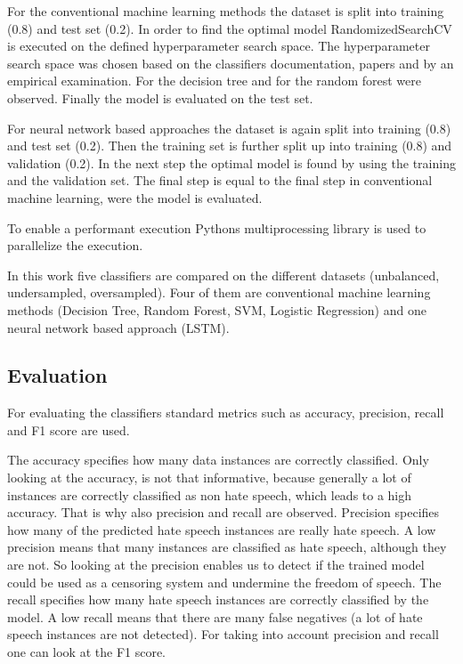 For the conventional machine learning methods the dataset is split into training (0.8) and test set (0.2). In order to find the optimal model Randomized\-SearchCV is executed on the defined hyperparameter search space. The hyperparameter search space was chosen based on the classifiers doc\-u\-men\-ta\-tion, papers and by an empirical examination. For the decision tree \cite{mantovani2019empirical} and for the random forest \cite{probstHyperparametersTuningStrategies2019} were observed. Finally the model is evaluated on the test set.


For neural network based approaches the dataset is again split into training (0.8) and test set (0.2). Then the training set is further split up into training (0.8) and validation (0.2). In the next step the optimal model is found by using the training and the validation set. The final step is equal to the final step in conventional machine learning, were the model is evaluated.

To enable a performant execution Pythons multiprocessing library is used to parallelize the execution.

In this work five classifiers are compared on the different datasets (unbalanced, undersampled, oversampled). Four of them are conventional machine learning methods (Decision Tree, Random Forest, SVM, Logistic Regression) and one neural network based approach (LSTM).

\subsection{Evaluation}
\label{ch:approachE}

For evaluating the classifiers standard metrics such as accuracy, precision, recall and F1 score are used.

The accuracy specifies how many data instances are correctly classified. Only looking at the accuracy, is not that informative, because generally a lot of instances are correctly classified as non hate speech, which leads to a high accuracy. That is why also precision and recall are observed. Precision specifies how many of the predicted hate speech instances are really hate speech. A low precision means that many instances are classified as hate speech, although they are not. So looking at the precision enables us to detect if the trained model could be used as a censoring system and undermine the freedom of speech. The recall specifies how many hate speech instances are correctly classified by the model. A low recall means that there are many false negatives (a lot of hate speech instances are not detected). For taking into account precision and recall one can look at the F1 score.

